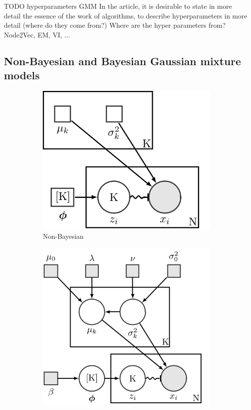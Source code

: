\documentclass[conference]{IEEEtran}
\begin{document}
TODO hyperparameters GMM
In the article, it is desirable to state in more detail the essence of the work of algorithms, to describe hyperparameters in more detail (where do they come from?)
Where are the hyper parameters from? Node2Vec, EM, VI, ...

\subsection{Non-Bayesian and Bayesian Gaussian mixture models}

\begin{figure}[H]
    \centering
    \begin{subfigure}[b]{.4\linewidth}
        \centering
        \includegraphics[width=1\linewidth]{images/ComE/GMM.png}
        \caption{Non-Bayesian}
    \end{subfigure}%
    \begin{subfigure}[b]{.5\linewidth}
        \centering
        \includegraphics[width=1\linewidth]{images/ComE/BGMM.png}

\end{subfigure}
\end{figure}
\end{document}
